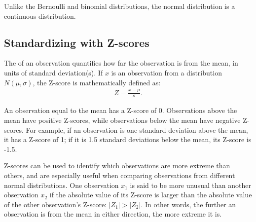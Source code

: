 Unlike the Bernoulli and binomial distributions, the normal distribution is a continuous distribution. 


\textD{\newpage}


\subsection{Standardizing with Z-scores}

The  of an observation quantifies how far the observation is from the mean, in units of standard deviation(s). If $x$ is an observation from a distribution $N(\mu, \sigma)$, the Z-score is mathematically defined as:
\begin{align*}
	Z = \frac{x-\mu}{\sigma}.
\end{align*}

An observation equal to the mean has a Z-score of 0. Observations above the mean have positive Z-scores, while observations below the mean have negative Z-scores. For example, if an observation is one standard deviation above the mean, it has a Z-score of 1; if it is 1.5 standard deviations below the mean, its Z-score is -1.5. 

Z-scores can be used to identify which observations are more extreme than others, and are especially useful when comparing observations from different normal distributions. One observation $x_1$ is said to be more unusual than another observation $x_2$ if the absolute value of its Z-score is larger than the absolute value of the other observation's Z-score: $|Z_1| > |Z_2|$. In other words, the further an observation is from the mean in either direction, the more extreme it is. 

